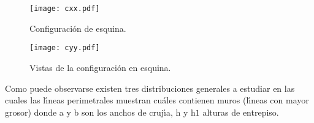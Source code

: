 \begin{figure} [htbp]
\centering
\texttt{[image: cxx.pdf]}
\caption{Configuraci\'on de esquina.}
\label{fig:casosaf5}
\end{figure}

\begin{figure} [htbp]
\centering
\texttt{[image: cyy.pdf]}
\caption{Vistas de la configuraci\'on en esquina.}
\label{fig:casosaf6}
\end{figure}

Como puede observarse existen tres distribuciones generales a estudiar en las cuales las l\'{\i}neas perimetrales muestran cu\'ales contienen muros (l\'{\i}neas con mayor grosor) donde a y b son los anchos de cruj\'{\i}a, h y h$1$ alturas de entrepiso. 

